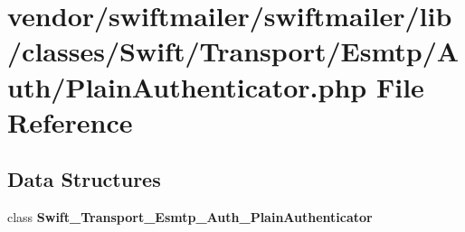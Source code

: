 \section{vendor/swiftmailer/swiftmailer/lib/classes/\+Swift/\+Transport/\+Esmtp/\+Auth/\+Plain\+Authenticator.php File Reference}
\label{_plain_authenticator_8php}
\subsection*{Data Structures}
\begin{DoxyCompactItemize}
\item 
class {\bf Swift\+\_\+\+Transport\+\_\+\+Esmtp\+\_\+\+Auth\+\_\+\+Plain\+Authenticator}
\end{DoxyCompactItemize}
